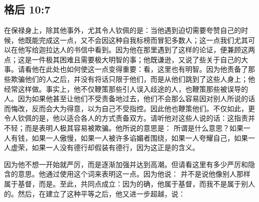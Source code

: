 

\section{}


\subsection{格后 10:7}

\par

在保禄身上，除其他事外，尤其令人钦佩的是：当他遇到迫切需要夸赞自己的时候，他既能完成这一点，又不会因这种自我标榜而冒犯多数人；这一点我们尤其可以在他写给迦拉达人的书信中看到。因为他在那里遇到了这样的论证，便兼顾这两点；这是一件极其困难且需要极大明智的事；他既谦逊，又说了些关于自己的大事。请看他在此处也如何使这一点变得重要：看，这里也有明智。因为他责备了那些欺骗他们的人之后，并没有将话只限于他们，而是从他们跳到了这些人身上；他经常这样做。事实上，他不仅鞭策那些引人误入歧途的人，也鞭策那些被误导的人。因为如果他甚至让他们不受责备地过去，他们不会那么容易因对别人所说的话而悔改，反而会大为得意，以为自己不受指控。因此他也鞭策他们。不仅如此，更令人钦佩的是，他以适合各人的方式责备双方。请听他对这些人说的话：这指责并不轻；而是表明人极其容易被欺骗。他所说的意思是： 所谓是什么意思？如果一人有钱，如果一人傲慢，如果一人被许多谄媚者围绕，如果一人夸耀自己，如果一人虚荣，如果一人没有德行却假装有德行，因为这正是的含义。\par

因为他不想一开始就严厉，而是逐渐加强并达到高潮。但请看这里有多少严厉和隐含的意思。他通过使用这个词来表明这一点。因为他说： 并不是说他像别人那样属于基督，而是。至此，共同点成立：因为的确，他属于基督，而我不是属于别人的。然后，在建立了这种平等之后，他又进一步超越，说：\par

